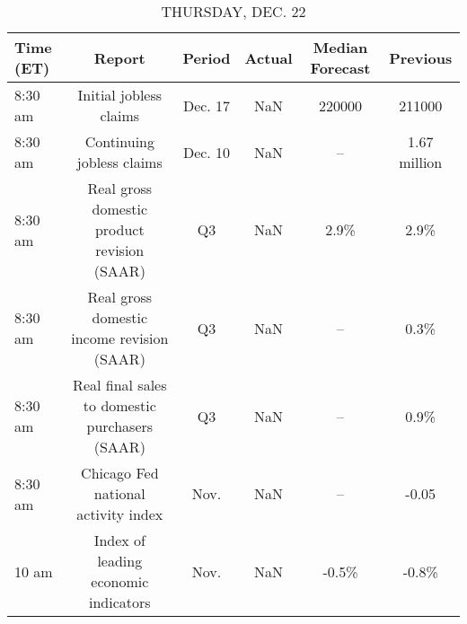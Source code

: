 \documentclass{article}%
\begin{document}
%


\begin{table}[htbp]%
\caption{THURSDAY, DEC. 22}%
\centering%
\begin{adjustbox}{width=1\textwidth}%
\begin{tabular}{lccccc}
\toprule
Time (ET) &                                         Report &  Period & Actual & Median Forecast &     Previous \\
\midrule
  8:30 am &                         Initial jobless claims & Dec. 17 &    NaN &          220000 &       211000 \\
  8:30 am &                      Continuing jobless claims & Dec. 10 &    NaN &              -- & 1.67 million \\
  8:30 am &    Real gross domestic product revision (SAAR) &      Q3 &    NaN &            2.9\% &         2.9\% \\
  8:30 am &     Real gross domestic income revision (SAAR) &      Q3 &    NaN &              -- &         0.3\% \\
  8:30 am & Real final sales to domestic purchasers (SAAR) &      Q3 &    NaN &              -- &         0.9\% \\
  8:30 am &            Chicago Fed national activity index &    Nov. &    NaN &              -- &        -0.05 \\
    10 am &           Index of leading economic indicators &    Nov. &    NaN &           -0.5\% &        -0.8\% \\
\bottomrule
\end{tabular}
%
\end{adjustbox}%
\end{table}

%
\end{document}
